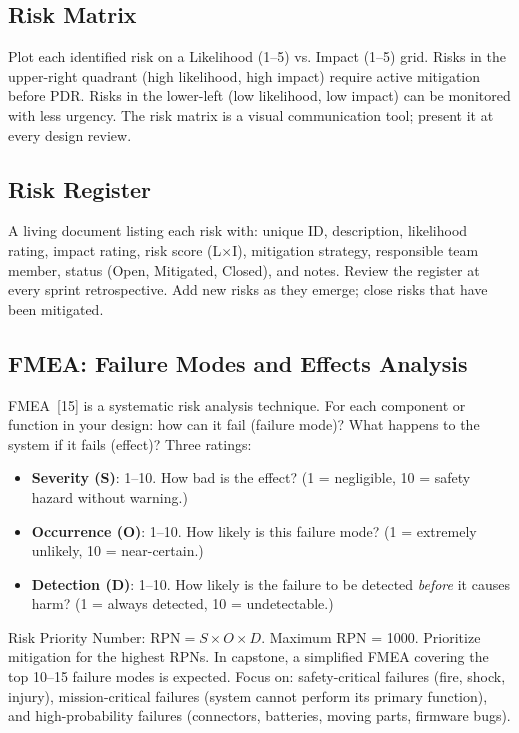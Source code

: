 \subsection{Risk Matrix}
Plot each identified risk on a Likelihood (1--5) vs. Impact (1--5) grid. Risks in the upper-right quadrant (high likelihood, high impact) require active mitigation before PDR. Risks in the lower-left (low likelihood, low impact) can be monitored with less urgency. The risk matrix is a visual communication tool; present it at every design review.

\subsection{Risk Register}
A living document listing each risk with: unique ID, description, likelihood rating, impact rating, risk score (L$\times$I), mitigation strategy, responsible team member, status (Open, Mitigated, Closed), and notes. Review the register at every sprint retrospective. Add new risks as they emerge; close risks that have been mitigated.

\subsection{FMEA: Failure Modes and Effects Analysis}
FMEA~[15] is a systematic risk analysis technique. For each component or function in your design: how can it fail (failure mode)? What happens to the system if it fails (effect)? Three ratings:
\begin{itemize}[nosep,leftmargin=1.5em]
\item \textbf{Severity (S)}: 1--10. How bad is the effect? (1 = negligible, 10 = safety hazard without warning.)
\item \textbf{Occurrence (O)}: 1--10. How likely is this failure mode? (1 = extremely unlikely, 10 = near-certain.)
\item \textbf{Detection (D)}: 1--10. How likely is the failure to be detected \emph{before} it causes harm? (1 = always detected, 10 = undetectable.)
\end{itemize}
Risk Priority Number: $\text{RPN} = S \times O \times D$. Maximum RPN = 1000. Prioritize mitigation for the highest RPNs. In capstone, a simplified FMEA covering the top 10--15 failure modes is expected. Focus on: safety-critical failures (fire, shock, injury), mission-critical failures (system cannot perform its primary function), and high-probability failures (connectors, batteries, moving parts, firmware bugs).

